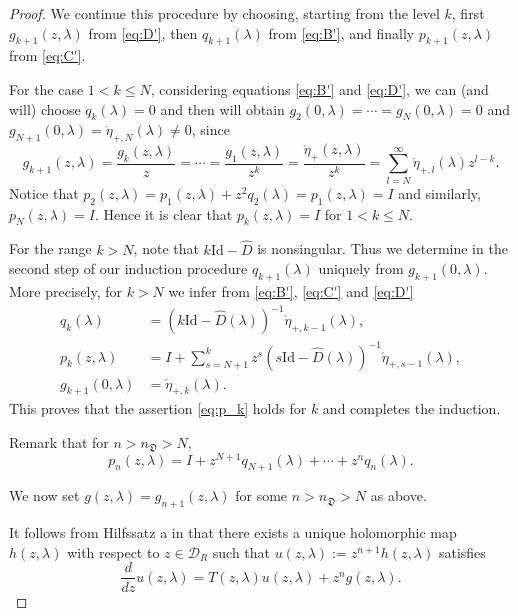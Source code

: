 \documentclass[a4paper,11pt]{amsart}
\theoremstyle{definition}
\numberwithin{equation}{section}
\begin{document}
\begin{proof}
We continue this procedure by choosing, starting from the level $k$, 
first $g_{k+1}(z, \lambda)$ from  \eqref{eq:D'}, then $q_{k+1}(\lambda)$ from  \eqref{eq:B'}, and finally $p_{k+1}(z, \lambda) $  from \eqref{eq:C'}.

 
For the case $1 <  k  \leq N$,
considering equations \eqref{eq:B'}  and \eqref{eq:D'}, 
we can (and will) choose $q_k(\lambda) = 0$ and then will obtain  $g_2(0, \lambda) = \cdots=g_N(0,\lambda)=0$ and $g_{N+1}(0,\lambda)=\mathring{\eta}_{+,N}(\lambda)\neq 0$,
since 
\begin{equation}
g_{k+1}(z,\lambda)=\frac{g_k(z,\lambda)}{z}
=\cdots=\frac{g_1(z,\lambda)}{z^k}=\frac{\mathring{\eta}_+(z,\lambda)}{z^k}
=\sum_{l=N}^{\infty}\mathring{\eta}_{+,l}(\lambda)z^{l-k}.
\end{equation}
Notice that $p_2(z,\lambda)=p_1(z,\lambda)+z^2 q_2(\lambda)=p_1(z,\lambda)=I$ and similarly, $p_N(z,\lambda)=I$. Hence 
it is clear that  $p_k(z, \lambda) = I$ for $1<k\leq N$.

 
For the range $k>N$, note that 
$k \mathrm{Id}-\hat{D}$ is  nonsingular.   
Thus we determine  in the  second  step 
of our induction procedure 
$q_{k+1}(\lambda)$ uniquely from $g_{k+1}(0,\lambda)$.
More precisely,  for $k > N$ we infer from  \eqref{eq:B'}, \eqref{eq:C'} and \eqref{eq:D'}
 \begin{equation*}
 \begin{aligned}
 q_{k}(\lambda)&=(k\mathrm{Id}-\hat{D} (\lambda))^{-1}\mathring{\eta}_{+, k-1}(\lambda), \\
 p_k(z,\lambda)&=I+\sum_{s=N+1}^{k} z^s (s \mathrm{Id}-\hat{D}(\lambda))^{-1} \mathring{\eta}_{+,s-1}(\lambda),\\
g_{k+1}(0,\lambda) &=\mathring{\eta}_{+,k}(\lambda).  
 \end{aligned}
 \end{equation*}
  This proves that the assertion \eqref{eq:p_k} holds for $k$ and 
completes the induction. 

Remark that for $n>n_\mathfrak{D} >N$,
$$p_n(z,\lambda)=I+z^{N+1} q_{N+1}(\lambda)+\cdots +z^n q_{n}(\lambda).$$

We now set $g(z,\lambda)=g_{n+1}(z,\lambda)$ for some $n>n_\mathfrak{D}> N$  
as above. 


It follows from Hilfssatz a in  \cite{Sch-Sch} that there exists a unique holomorphic map $h(z,\lambda)$  with respect to $z\in \mathcal{D}_R$ such that $u(z,\lambda):=z^{n+1} h(z,\lambda)$ satisfies
$$\frac{d}{dz}u(z,\lambda)=T(z,\lambda)u(z,\lambda)+z^n g(z,\lambda).$$


\end{proof}
\end{document}
